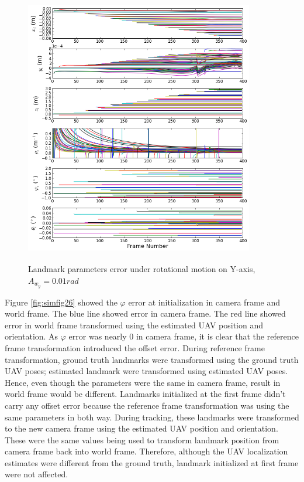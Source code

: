 \begin{figure}[h]
  \centering
  \includegraphics[width=10cm, height=12cm]{./Figures/SimulationFigures/Figure25.png}
  \caption{Landmark parameters error under rotational motion on
    Y-axis, $A_{w_y}=0.01rad$}
  \label{fig:simfig25}
\end{figure}
\FloatBarrier

Figure \ref{fig:simfig26} showed the $\varphi$ error at initialization
in camera frame and world frame. The blue line showed error in camera
frame. The red line showed error in world frame transformed using the
estimated UAV position and orientation. As $\varphi$ error was nearly
0 in camera frame, it is clear that the reference frame transformation
introduced the offset error. During reference frame transformation,
ground truth landmarks were transformed using the ground truth UAV
poses; estimated landmark were transformed using estimated UAV poses.
Hence, even though the parameters were the same in camera frame,
result in world frame would be different. Landmarks initialized at the
first frame didn't carry any offset error because the reference frame
transformation was using the same parameters in both way. During
tracking, these landmarks were transformed to the new camera frame
using the estimated UAV position and orientation. These were the same
values being used to transform landmark position from camera frame
back into world frame. Therefore, although the UAV localization
estimates were different from the ground truth, landmark initialized
at first frame were not affected. 

